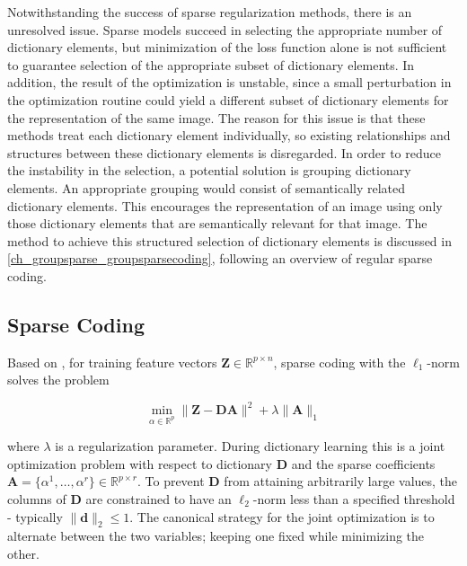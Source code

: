 Notwithstanding the success of sparse regularization methods, there is an unresolved issue. Sparse models succeed in selecting the appropriate number of dictionary elements, but minimization of the loss function alone is not sufficient to guarantee selection of the appropriate subset of dictionary elements. In addition, the result of the optimization is unstable, since a small perturbation in the optimization routine could yield a different subset of dictionary elements for the representation of the same image. The reason for this issue is that these methods treat each dictionary element individually, so existing relationships and structures between these dictionary elements is disregarded. In order to reduce the instability in the selection, a potential solution is grouping dictionary elements. An appropriate grouping would consist of semantically related dictionary elements. This encourages the representation of an image using only those dictionary elements that are semantically relevant for that image. 
The method to achieve this structured selection of dictionary elements is discussed in \cref{ch_groupsparse_groupsparsecoding}, following an overview of regular sparse coding.

\subsection[Sparse Coding]{Sparse Coding}
\label{ch_groupsparse_subsec_Lasso}

Based on \citep{Aharon2006}, for training feature vectors $\mathbf{Z} \in \mathds{R}^{p \times n}$, sparse coding with the $\ell_{1}$-norm solves the problem

\begin{equation} \label{eq:l1lossfn}
 \min_{\alpha \in \mathds{R}^{p}} \parallel \mathbf{Z} - \mathbf{D} \mathbf{A} \parallel^{2} + \lambda \parallel \mathbf{A} \parallel_{1}
\end{equation}

where $\lambda$ is a regularization parameter. During dictionary learning this is a joint optimization problem with respect to dictionary $\mathbf{D}$ and the sparse coefficients $\mathbf{A} = \{\alpha^{1}, \ldots, \alpha^{r} \} \in \mathds{R}^{p \times r}$. To prevent $\mathbf{D}$ from attaining arbitrarily large values, the columns of $\mathbf{D}$ are constrained to have an $\ell_{2}$-norm less than a specified threshold - typically $\parallel \mathbf{d} \parallel_{2} \leq 1$. The canonical strategy for the joint optimization is to alternate between the two variables; keeping one fixed while minimizing the other.


